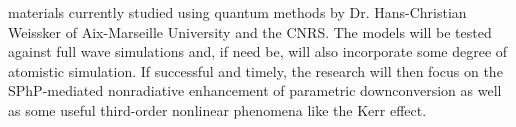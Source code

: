 \documentclass[11pt,a4paper]{article}
\begin{document}
materials currently studied using quantum methods by Dr. Hans-Christian Weissker of Aix-Marseille University and the CNRS. The models will be tested against full wave simulations and, if need be, will also incorporate some degree of atomistic simulation. If successful and timely, the research will then focus on the SPhP-mediated nonradiative enhancement of parametric downconversion as well as some useful third-order nonlinear phenomena like the Kerr effect. 



















\end{document}

